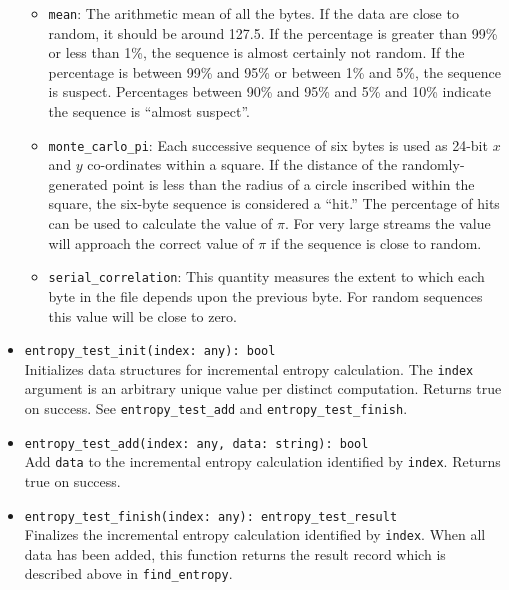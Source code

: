 \documentclass[10pt,landscape]{article}
\newcommand{\ReturnsTrueOnSuccess}{Returns true on success.\xspace}
\begin{document}
\begin{multicols*}{2}
\begin{itemize}
{\begin{itemize}
        number and a percentage which indicates how frequently a truly random
        sequence would exceed the value calculated, i.e., the degree to which
        the sequence tested is suspected of being non-random.
      \item \verb|mean|: The arithmetic mean of all the bytes. If the data are
        close to random, it should be around 127.5.
        If the percentage is greater than 99\% or less than 1\%, the sequence
        is almost certainly not random. If the percentage is between 99\% and
        95\% or between 1\% and 5\%, the sequence is suspect. Percentages
        between 90\% and 95\% and 5\% and 10\% indicate the sequence is
        ``almost suspect''.
      \item \verb|monte_carlo_pi|: Each successive sequence of six bytes is
        used as 24-bit $x$ and $y$ co-ordinates within a square. If the
        distance of the randomly-generated point is less than the radius of a
        circle inscribed within the square, the six-byte sequence is considered
        a ``hit.'' The percentage of hits can be used to calculate the value of
        $\pi$. For very large streams the value will approach the correct value
        of $\pi$ if the sequence is close to random. 
      \item \verb|serial_correlation|: This quantity measures the extent to
        which each byte in the file depends upon the previous byte. For random
        sequences this value will be close to zero.
    \end{itemize}
}
  \item \verb|entropy_test_init(index: any): bool|\\
    Initializes data structures for incremental entropy calculation. The
    \verb|index| argument is an arbitrary unique value per distinct
    computation.
    \ReturnsTrueOnSuccess
    See \verb|entropy_test_add| and \verb|entropy_test_finish|.
  \item \verb|entropy_test_add(index: any, data: string): bool|\\
    Add \verb|data| to the incremental entropy calculation identified by
    \verb|index|.
    \ReturnsTrueOnSuccess
  \item \verb|entropy_test_finish(index: any): entropy_test_result|\\
    Finalizes the incremental entropy calculation identified by \verb|index|.
    When all data has been added, this function returns the result record which
    is described above in \verb|find_entropy|.
\end{itemize}


\end{multicols*}
\end{document}
